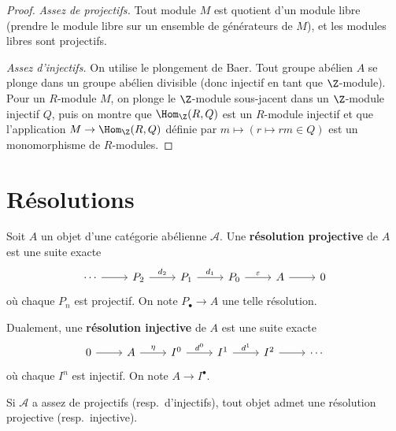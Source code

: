 \begin{proof}
\emph{Assez de projectifs.} Tout module $M$ est quotient d'un module
libre (prendre le module libre sur un ensemble de générateurs de $M$),
et les modules libres sont projectifs.

\emph{Assez d'injectifs.} On utilise le plongement de Baer. Tout
groupe abélien $A$ se plonge dans un groupe abélien divisible
(donc injectif en tant que $\Z$-module). Pour un $R$-module $M$,
on plonge le $\Z$-module sous-jacent dans un $\Z$-module injectif $Q$,
puis on montre que $\Hom_\Z(R, Q)$ est un $R$-module injectif
et que l'application $M \to \Hom_\Z(R, Q)$ définie par
$m \mapsto (r \mapsto rm \in Q)$ est un monomorphisme de $R$-modules.
\end{proof}


\section{Résolutions}\label{sec:resolutions}

\begin{definition}\label{def:projective-resolution}
Soit $A$ un objet d'une catégorie abélienne $\mathcal{A}$.
Une \textbf{résolution projective} de $A$ est une suite exacte
\[
\begin{tikzcd}
\cdots \arrow[r] & P_2 \arrow[r, "d_2"] & P_1 \arrow[r, "d_1"]
  & P_0 \arrow[r, "\varepsilon"] & A \arrow[r] & 0
\end{tikzcd}
\]
où chaque $P_n$ est projectif. On note $P_\bullet \to A$ une telle résolution.
\end{definition}

\begin{definition}\label{def:injective-resolution}
Dualement, une \textbf{résolution injective} de $A$ est une suite exacte
\[
\begin{tikzcd}
0 \arrow[r] & A \arrow[r, "\eta"] & I^0 \arrow[r, "d^0"]
  & I^1 \arrow[r, "d^1"] & I^2 \arrow[r] & \cdots
\end{tikzcd}
\]
où chaque $I^n$ est injectif. On note $A \to I^\bullet$.
\end{definition}

\begin{proposition}\label{prop:resolution-existence}
Si $\mathcal{A}$ a assez de projectifs (resp.\ d'injectifs), tout
objet admet une résolution projective (resp.\ injective).
\end{proposition}

